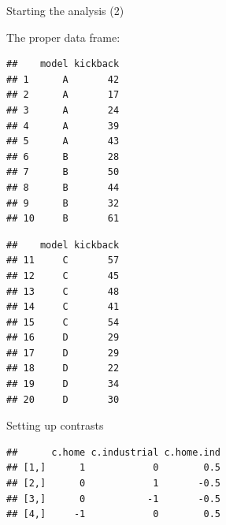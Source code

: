 \begin{frame}[fragile]{Starting the analysis (2)}
  
  The proper data frame:
  
  \begin{multicols}{2}
\begin{knitrout}
\color{fgcolor}\begin{kframe}
\begin{alltt}
\hlstd{chain[}\hlopt{:}\hlstd{,]}
\end{alltt}
\begin{verbatim}
##    model kickback
## 1      A       42
## 2      A       17
## 3      A       24
## 4      A       39
## 5      A       43
## 6      B       28
## 7      B       50
## 8      B       44
## 9      B       32
## 10     B       61
\end{verbatim}
\end{kframe}
\end{knitrout}

\begin{knitrout}
\color{fgcolor}\begin{kframe}
\begin{alltt}
\hlstd{chain[}\hlopt{:}\hlstd{,]}
\end{alltt}
\begin{verbatim}
##    model kickback
## 11     C       57
## 12     C       45
## 13     C       48
## 14     C       41
## 15     C       54
## 16     D       29
## 17     D       29
## 18     D       22
## 19     D       34
## 20     D       30
\end{verbatim}
\end{kframe}
\end{knitrout}
  \end{multicols}
\end{frame}

\begin{frame}[fragile]{Setting up contrasts}
  
\begin{knitrout}
\color{fgcolor}\begin{kframe}
\begin{alltt}
\hlkwb{=}
\end{alltt}
\begin{verbatim}
##      c.home c.industrial c.home.ind
## [1,]      1            0        0.5
## [2,]      0            1       -0.5
## [3,]      0           -1       -0.5
## [4,]     -1            0        0.5
\end{verbatim}
\begin{alltt}
\hlkwb{=}
\end{alltt}
\end{kframe}
\end{knitrout}

  
\end{frame}

